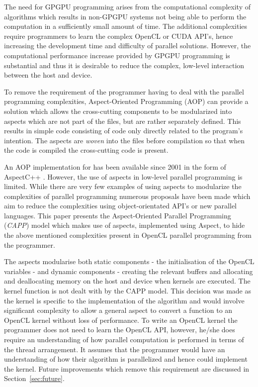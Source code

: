 \documentclass{sig-alternate-05-2015}
\begin{document}
The need for GPGPU programming arises from the computational complexity of
algorithms which results in non-GPGPU systems not being able to perform the
computation in a sufficiently small amount of time. The additional complexities
require programmers to learn the complex OpenCL or CUDA API's, hence increasing
the development time and difficulty of parallel solutions. However, the computational
performance increase
provided by GPGPU programming is substantial and thus it is desirable to reduce the complex, low-level
interaction between the host and device.

To remove the requirement of the programmer having to deal with the parallel
programming complexities, 
Aspect-Oriented Programming  (AOP) \cite{gregor:aop} can provide a solution which 
allows the cross-cutting components to be modularized into aspects which are not
part of the \CPP files, but are rather separately defined. This
results in simple \CPP code consisting of code only directly related to 
the program's intention. The aspects are \textit{woven} into the \CPP files before 
compilation so that when the code is compiled the cross-cutting code is present.

An AOP implementation for \CPP has been available  since 2001 in the form of AspectC++ 
\cite{gal:acppprop, olaf:app}. However, the use of aspects in low-level
parallel programming is limited. While there are very few examples of using
aspects to modularize the complexities of parallel programming numerous proposals 
have been made which aim to reduce the complexities using object-orientated
API's or new parallel languages.  This paper presents the \CPP Aspect-Oriented Parallel
Programming (\textit{CAPP}) model which makes use of aspects, implemented using Aspect\CPP, to 
hide the above mentioned complexities present in OpenCL parallel programming 
from the programmer. 

The aspects modularise both static components - the initialisation of the
OpenCL variables - and dynamic components - creating the relevant buffers
and allocating and deallocating memory on the host and device when kernels are
executed. The kernel function is not dealt with by the CAPP model. This
decision was made as the kernel is specific to the implementation of the
algorithm and would involve significant complexity to allow a general aspect to
convert a \CPP function to an OpenCL kernel without loss of performance. To write 
an OpenCL kernel the programmer does not need to learn the OpenCL API, however,
he/she does require an understanding of how parallel computation is performed in terms of
the thread arrangement. It assumes that the programmer would have an
understanding of how their algorithm is parallelized and hence could implement
the kernel. Future improvements which remove this requirement are discussed in
Section~\ref{sec:future}.
\end{document}
